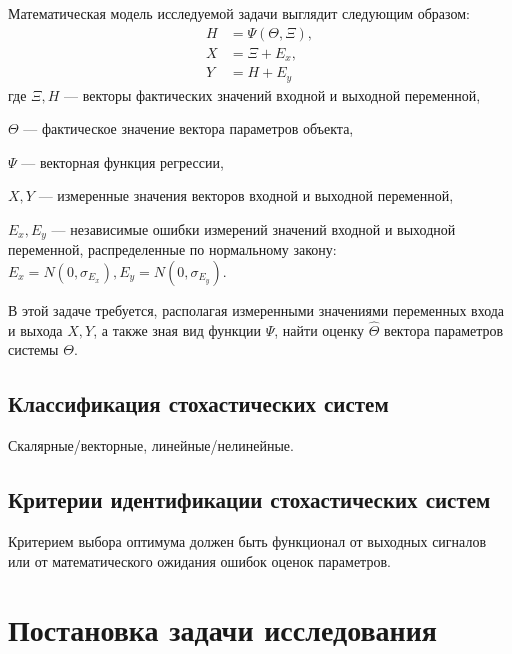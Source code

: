 Математическая модель исследуемой задачи выглядит следующим образом:
\begin{equation}
  \label{eq:model}
  \begin{aligned}
  H &= \Psi (\Theta, \Xi), \\
  X &= \Xi + E_x, \\
  Y &= H + E_y
  \end{aligned}
\end{equation}
где \( \Xi, H \) --- векторы фактических значений входной и выходной переменной, \par
\( \Theta \) --- фактическое значение вектора параметров объекта, \par
\( \Psi \) --- векторная функция регрессии, \par
\( X, Y \) --- измеренные значения векторов входной и выходной переменной, \par
\( E_x, E_y \) --- независимые ошибки измерений значений входной и выходной переменной,
распределенные по нормальному закону:
{\color{red} \( E_x = N(0, \sigma_{E_x}), E_y = N(0, \sigma_{E_y}) \)}.

В этой задаче требуется, располагая измеренными значениями переменных входа и выхода
\( X, Y \), а также зная вид функции \( \Psi \), найти оценку
$ \hat{\Theta} $ вектора параметров системы $ \Theta $.


\newpage
\subsection{Классификация стохастических систем}

Скалярные/векторные, линейные/нелинейные.

\subsection{Критерии идентификации стохастических систем}

Критерием выбора оптимума должен быть функционал от выходных
сигналов или от математического ожидания ошибок оценок параметров.

\section{Постановка задачи исследования}





